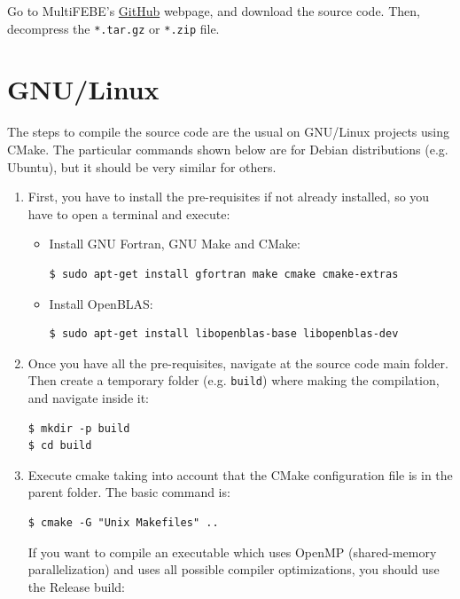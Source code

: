 \documentclass[a4paper,fleqn]{book}
\begin{document}
\label{ap:compilation}

Go to MultiFEBE's \href{https://github.com/mmc-siani-es/MultiFEBE}{GitHub} webpage, and download the source code. Then, decompress the \texttt{*.tar.gz} or \texttt{*.zip} file.

\section{GNU/Linux}

The steps to compile the source code are the usual on GNU/Linux projects using CMake. The particular commands shown below are for Debian distributions (e.g. Ubuntu), but it should be very similar for others. 
\begin{enumerate}
    \item First, you have to install the pre-requisites if not already installed, so you have to open a terminal and execute:
    \begin{itemize}
        \item Install GNU Fortran, GNU Make and CMake:
\begin{Verbatim}[frame=single, fontsize=\small]
$ sudo apt-get install gfortran make cmake cmake-extras
\end{Verbatim}
        \item Install OpenBLAS:
\begin{Verbatim}[frame=single, fontsize=\small]
$ sudo apt-get install libopenblas-base libopenblas-dev
\end{Verbatim}
    \end{itemize}
    \item Once you have all the pre-requisites, navigate at the source code main folder. Then create a temporary folder (e.g. \texttt{build}) where making the compilation, and navigate inside it:
\begin{Verbatim}[frame=single, fontsize=\small]
$ mkdir -p build
$ cd build
\end{Verbatim}
    \item Execute cmake taking into account that the CMake configuration file is in the parent folder. The basic command is:
\begin{Verbatim}[frame=single, fontsize=\small]
$ cmake -G "Unix Makefiles" ..
\end{Verbatim}
If you want to compile an executable which uses OpenMP (shared-memory parallelization) and uses all possible compiler optimizations, you should use the Release build:
\begin{Verbatim}[frame=single, fontsize=\small]

\end{Verbatim}
\end{enumerate}
\end{document}
